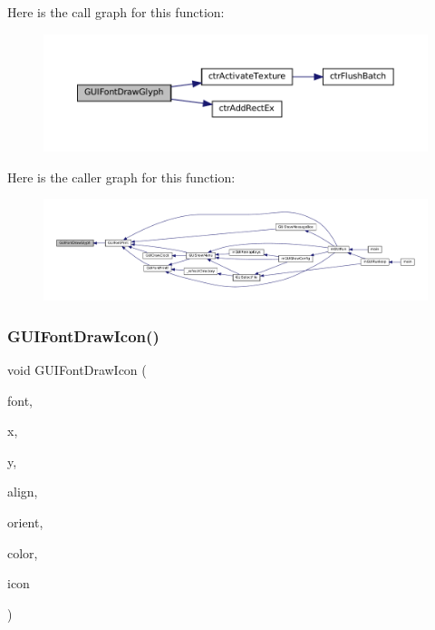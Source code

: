 Here is the call graph for this function\+:
\nopagebreak
\begin{figure}[H]
\begin{center}
\leavevmode
\includegraphics[width=350pt]{3ds_2gui-font_8c_a6afd907275ce70a3b44246e55bb9eb99_cgraph}
\end{center}
\end{figure}
Here is the caller graph for this function\+:
\nopagebreak
\begin{figure}[H]
\begin{center}
\leavevmode
\includegraphics[width=350pt]{3ds_2gui-font_8c_a6afd907275ce70a3b44246e55bb9eb99_icgraph}
\end{center}
\end{figure}
\mbox{\label{3ds_2gui-font_8c_a89adf10a0ec4d3b2dfba92b95ab17ad5}} 
\subsubsection{\texorpdfstring{G\+U\+I\+Font\+Draw\+Icon()}{GUIFontDrawIcon()}}
{\footnotesize\ttfamily void G\+U\+I\+Font\+Draw\+Icon (\begin{DoxyParamCaption}\item[{const struct G\+U\+I\+Font $\ast$}]{font,  }\item[{\mbox{\hyperlink{ioapi_8h_a787fa3cf048117ba7123753c1e74fcd6}{int}}}]{x,  }\item[{\mbox{\hyperlink{ioapi_8h_a787fa3cf048117ba7123753c1e74fcd6}{int}}}]{y,  }\item[{enum G\+U\+I\+Alignment}]{align,  }\item[{enum G\+U\+I\+Orientation}]{orient,  }\item[{uint32\+\_\+t}]{color,  }\item[{enum G\+U\+I\+Icon}]{icon }\end{DoxyParamCaption})}

